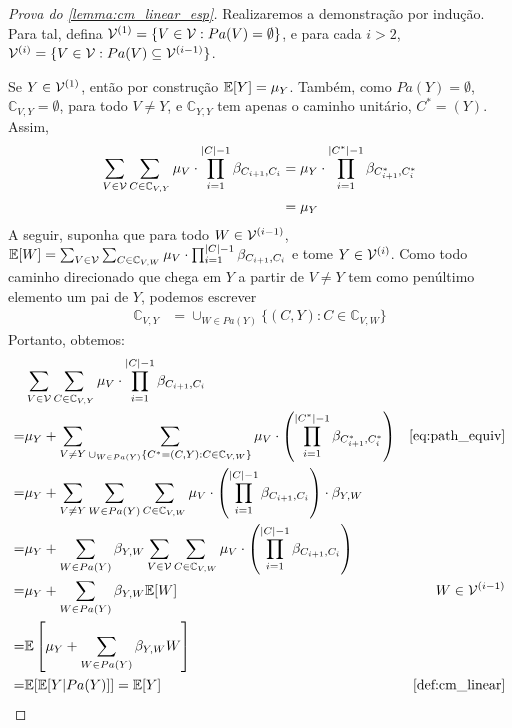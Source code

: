 \begin{proof}[Prova do \cref{lemma:cm_linear_esp}]
 Realizaremos a demonstração por indução.
 Para tal, defina 
 ${\mathcal V}^{(1)} = \{V \in {\mathcal V}: Pa(V) = \emptyset\}$, e
 para cada $i > 2$,
 ${\mathcal V}^{(i)} = \{V \in {\mathcal V}: Pa(V) \subseteq {\mathcal V}^{(i-1)}\}$.
 
 Se $Y \in {\mathcal V}^{(1)}$, então por construção
 ${\mathbb E}[Y] = \mu_Y$. Também, como $Pa(Y) = \emptyset$,
 $\mathbb{C}_{V,Y} = \emptyset$, para todo $V \neq Y$, e
 $\mathbb{C}_{Y,Y}$ tem apenas o caminho unitário, $C^* = (Y)$.
 Assim,
 \begin{align*}
  \sum_{V \in \mathbb{{\mathcal V}}} 
  \sum_{C \in \mathbb{C}_{V,Y}}
  \mu_V \cdot \prod_{i=1}^{|C|-1} \beta_{C_{i+1},C_i} 
  &= \mu_Y \cdot \prod_{i=1}^{|C^*|-1} \beta_{C^*_{i+1},C^*_i} \\
  &= \mu_Y
 \end{align*}
 A seguir, suponha que para todo
 $W \in {\mathcal V}^{(i-1)}$,
 ${\mathbb E}[W] = \sum_{V \in \mathbb{{\mathcal V}}}\sum_{C \in \mathbb{C}_{V,W}} \mu_V \cdot 
 \prod_{i=1}^{|C|-1} \beta_{C_{i+1},C_i}$ e
 tome $Y \in {\mathcal V}^{(i)}$. Como todo caminho direcionado que 
 chega em $Y$ a partir de $V \neq Y$
 tem como penúltimo elemento um pai de $Y$,
 podemos escrever
 \begin{align}
  \label{eq:path_equiv}
  \mathbb{C}_{V,Y} 
  &= \cup_{W \in Pa(Y)} \{(C,Y): C \in \mathbb{C}_{V,W}\}
 \end{align}
 Portanto, obtemos:
 \begin{align*}
  &\sum_{V \in \mathbb{\sV}}\sum_{C \in \mathbb{C}_{V,Y}} \mu_V \cdot 
  \prod_{i=1}^{|C|-1} \beta_{C_{i+1},C_i} \\
  =& \mu_Y 
  + \sum_{V \neq Y} \sum_{\cup_{W \in Pa(Y)} \{C^* = (C,Y): C \in \mathbb{C}_{V,W}\}} 
  \mu_V \cdot \left(\prod_{i=1}^{|C^*|-1} \beta_{C^*_{i+1},C^*_i}\right) 
  & \text{\cref{eq:path_equiv}} \\
  =& \mu_Y + \sum_{V \neq Y} \sum_{W \in Pa(Y)} \sum_{C \in \mathbb{C}_{V,W}}
  \mu_V \cdot \left(\prod_{i=1}^{|C|-1} \beta_{C_{i+1},C_i}\right) \cdot \beta_{Y, W} \\
  =& \mu_Y + \sum_{W \in Pa(Y)} \beta_{Y, W} 
  \sum_{V \in \sV} \sum_{C \in \mathbb{C}_{V,W}}
  \mu_V \cdot \left(\prod_{i=1}^{|C|-1} \beta_{C_{i+1},C_i}\right) \\
  =& \mu_Y + \sum_{W \in Pa(Y)} \beta_{Y,W} \E[W]
  & W \in \sV^{(i-1)} \\
  =& \E\left[\mu_Y + \sum_{W \in Pa(Y)} \beta_{Y,W} W\right] \\
  =& \E[\E[Y|Pa(Y)]] = \E[Y]
  & \text{\cref{def:cm_linear}}
 \end{align*}
\end{proof}

